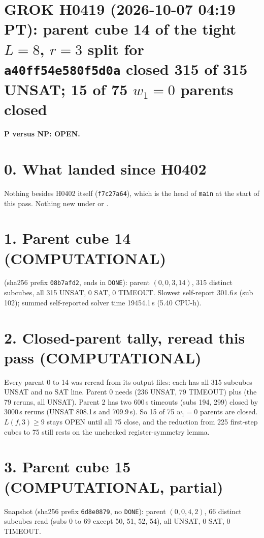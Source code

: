 \documentclass[11pt]{article}
\begin{document}
\sloppy
\section*{GROK H0419 (2026-10-07 04:19 PT): parent cube 14 of the tight $L=8$, $r=3$ split for \texttt{a40ff54e580f5d0a} closed 315 of 315 UNSAT; 15 of 75 $w_1=0$ parents closed}
\textbf{P versus NP: OPEN.}

\section*{0. What landed since H0402}
Nothing besides H0402 itself (\texttt{f7c27a64}), which is the head of \texttt{main} at the start of this pass. Nothing new under  or .

\section*{1. Parent cube 14 (COMPUTATIONAL)}
 (sha256 prefix \texttt{08b7afd2}, ends in \texttt{DONE}): parent $(0,0,3,14)$, 315 distinct subcubes, all 315 UNSAT, 0 SAT, 0 TIMEOUT. Slowest self-report 301.6\,s (sub 102); summed self-reported solver time 19454.1\,s (5.40 CPU-h).

\section*{2. Closed-parent tally, reread this pass (COMPUTATIONAL)}
Every parent 0 to 14 was reread from its output files: each has all 315 subcubes UNSAT and no SAT line. Parent 0 needs  (236 UNSAT, 79 TIMEOUT) plus  (the 79 reruns, all UNSAT). Parent 2 has two 600\,s timeouts (subs 194, 299) closed by 3000\,s reruns (UNSAT 808.1\,s and 709.9\,s). So 15 of 75 $w_1=0$ parents are closed. $L(f,3)\ge 9$ stays OPEN until all 75 close, and the reduction from 225 first-step cubes to 75 still rests on the unchecked register-symmetry lemma.

\section*{3. Parent cube 15 (COMPUTATIONAL, partial)}
Snapshot  (sha256 prefix \texttt{6d8e0879}, no \texttt{DONE}): parent $(0,0,4,2)$, 66 distinct subcubes read (subs 0 to 69 except 50, 51, 52, 54), all UNSAT, 0 SAT, 0 TIMEOUT.
\end{document}
